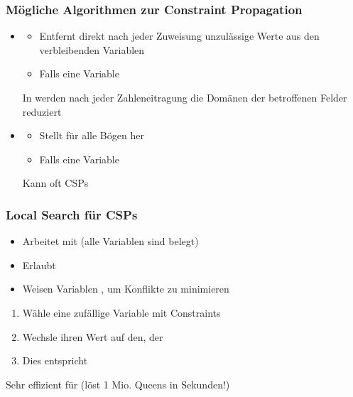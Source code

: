 \subsubsection*{Mögliche Algorithmen zur Constraint Propagation}
\begin{itemize}
    \item {}
    \begin{itemize}
        \item Entfernt direkt nach jeder Zuweisung unzulässige Werte aus den verbleibenden Variablen
        \item Falls eine Variable 
    \end{itemize}
     In  werden nach jeder Zahleneitragung die Domänen der betroffenen Felder reduziert
    \item {}
    \begin{itemize}
        \item Stellt  für alle Bögen her
        \item Falls eine Variable 
    \end{itemize}
     Kann oft CSPs 
\end{itemize}
\subsubsection*{Local Search für CSPs}
\begin{itemize}
    \item Arbeitet mit  (alle Variablen sind belegt)
    \item Erlaubt 
    \item {} Weisen Variablen , um Konflikte zu minimieren
\end{itemize}
\begin{enumerate}
    \item Wähle eine zufällige Variable mit  Constraints
    \item Wechsle ihren Wert auf den, der 
    \item Dies entspricht 
\end{enumerate}
 Sehr effizient für  (löst 1 Mio. Queens in Sekunden!)
